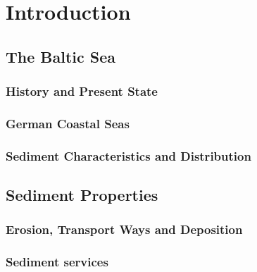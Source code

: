 \chapter{Introduction}
\label{kap-einleitung}



\section{The Baltic Sea}

\subsection{History and Present State}

\subsection{German Coastal Seas}

\subsection{Sediment Characteristics and Distribution}

\section{Sediment Properties}

\subsection{Erosion, Transport Ways and Deposition}

\subsection{Sediment services}
